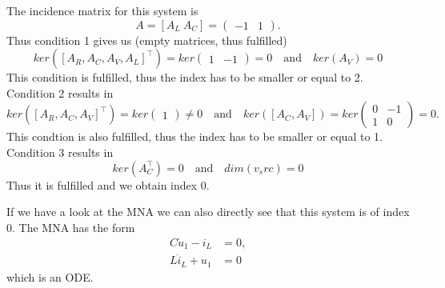 	The incidence matrix for this system is
	\begin{displaymath}
		A = [A_L~A_C] = 
		\left(
		\begin{matrix}
			-1 & 1
		\end{matrix}
		\right).
	\end{displaymath} 
	Thus condition 1 gives us (empty matrices, thus fulfilled)
	\begin{displaymath}
		ker([A_R, A_C, A_V, A_L]^\top) = ker
		\left(
		\begin{matrix}
			1 & -1
		\end{matrix}
		\right) = 0 
		\quad \text{and} \quad 
		ker(A_V) = 0
	\end{displaymath}
	This condition is fulfilled, thus the index has to be smaller or equal to 2.
	Condition 2 results in
	\begin{displaymath}
		ker([A_R, A_C, A_V]^\top) = ker\left(
		\begin{matrix}
			1
		\end{matrix}
		\right) \neq 0
		\quad \text{and} \quad
		ker([A_C, A_V]) = ker
		\left(
		\begin{matrix}
			0 & -1\\
			1 & 0
		\end{matrix}
		\right) = 0.
	\end{displaymath}
	This condtion is also fulfilled, thus the index has to be smaller or equal to 1.
	Condition 3 results in
	\begin{displaymath}
		ker(A_C^\top) = 0 \quad \text{and} \quad dim(v_src) = 0
	\end{displaymath}
	Thus it is fulfilled and we obtain index 0.
	
	If we have a look at the MNA we can also directly see that this system is of index 0. The MNA has the form
	\begin{displaymath}
		\begin{aligned}
			C \dot{u}_1 - i_L &= 0, \\
			L \dot{i}_L + u_1 &= 0
		\end{aligned}
	\end{displaymath}
	which is an ODE.

